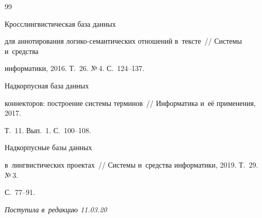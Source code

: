 {{\begin{thebibliography}{99}

 Кросслингвистическая база данных 

для аннотирования логико-семантических отношений в~тексте~/\!\!/ Системы и~средства 

информатики, 2016. Т.~26. №\,4. С.~124--137.




 Надкорпусная база данных 

коннекторов: построение системы терминов~/\!\!/ Информатика и~её применения, 2017. 

Т.~11. Вып.~1. С.~100--108.


 Надкорпусные базы данных 

в~лингвистических проектах~/\!\!/ Системы и~средства информатики, 2019. Т.~29. №\,3. 

С.~77--91.





 \end{thebibliography}

} }



\vspace*{-6pt}



\hfill{\small\textit{Поступила в~редакцию 11.03.20}}












\newpage



\vspace*{-28pt}









\def\tit{TASKS OF THE PHRASEOLOGICAL DICTIONARY DATABASE 

AND~STAGES OF~ITS DESIGN}



